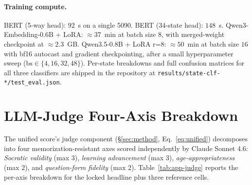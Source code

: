 \documentclass[11pt]{article}
\begin{document}
\begin{table}[h]
  \centering
  \small
  \caption{Per-stage and overall accuracy (\%) of the three deterministic-classifier consultants on the $4{,}304$-turn test split. The architectural progression is concentrated on stage~c (the binding constraint).}
  \label{tab:app-classifier}
\end{table}

\paragraph{Training compute.} BERT (5-way head): $92$~s on a single 5090. BERT (34-state head): $148$~s. Qwen3-Embedding-0.6B + LoRA: $\approx 37$~min at batch size $8$, with merged-weight checkpoint at $\approx 2.3$~GB. Qwen3.5-0.8B + LoRA r=8: $\approx 50$~min at batch size $16$ with bf16 autocast and gradient checkpointing, after a small hyperparameter sweep ($\text{bs}\in\{4, 16, 32, 48\}$). Per-state breakdowns and full confusion matrices for all three classifiers are shipped in the repository at \texttt{results/state-clf-*/test\_eval.json}.

\section{LLM-Judge Four-Axis Breakdown}
\label{app:judge}

The unified score's judge component (\S\ref{sec:method}, Eq.~\ref{eq:unified}) decomposes into four memorization-resistant axes scored independently by Claude Sonnet 4.6: \emph{Socratic validity} (max $3$), \emph{learning advancement} (max $3$), \emph{age-appropriateness} (max $2$), and \emph{question-form fidelity} (max $2$). Table~\ref{tab:app-judge} reports the per-axis breakdown for the locked headline plus three reference cells.
\end{document}

